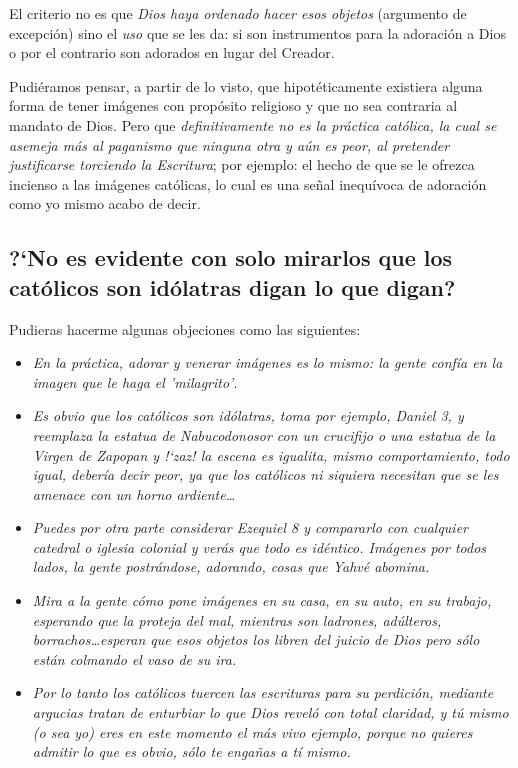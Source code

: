 \documentclass{article}
\begin{document}
\noindent
El criterio no es que \emph{Dios haya ordenado hacer esos objetos} (argumento de excepci\'on) sino el \emph{uso} que se les da: si son instrumentos para la adoraci\'on a Dios o por el contrario son adorados en lugar del Creador.

Pudi\'eramos pensar, a partir de lo visto, que hipot\'eticamente existiera alguna forma de tener im\'agenes con prop\'osito religioso y que no sea contraria al mandato de Dios. Pero que \emph{definitivamente no es la pr\'actica cat\'olica, la cual se asemeja m\'as al paganismo que ninguna otra y a\'un es peor, al pretender justificarse torciendo la Escritura}; por ejemplo: el hecho de que se le ofrezca incienso a las im\'agenes cat\'olicas, lo cual es una se\~nal inequ\'ivoca de adoraci\'on como yo mismo acabo de decir.
\subsection{?`No es evidente con solo mirarlos que los cat\'olicos son id\'olatras digan lo que digan?}

Pudieras hacerme algunas objeciones como las siguientes:

\begin{itemize}
\item
\emph{En la pr\'actica, adorar y venerar im\'agenes es lo mismo: la gente conf\'{i}a en la imagen que le haga el 'milagrito'}.

\item
\emph{Es obvio que los cat\'olicos son id\'olatras, toma por ejemplo, Daniel 3, y reemplaza la estatua de Nabucodonosor con un crucifijo o una estatua de la Virgen de Zapopan y !`zaz! la escena es igualita, mismo comportamiento, todo igual, deber\'{i}a decir peor, ya que los cat\'olicos ni siquiera necesitan que se les amenace con un horno ardiente\ldots}

\item
\emph{Puedes por otra parte considerar Ezequiel 8 y compararlo con cualquier catedral o iglesia colonial y ver\'as que todo es id\'entico. Im\'agenes por todos lados, la gente postr\'andose, adorando, cosas que Yahv\'e abomina.}

\item
\emph{Mira a la gente c\'omo pone im\'agenes en su casa, en su auto, en su trabajo, esperando que la proteja del mal, mientras son ladrones, ad\'ulteros, borrachos\ldots esperan que esos objetos los libren del juicio de Dios pero s\'olo est\'an colmando el vaso de su ira.}

\item
\emph{Por lo tanto los cat\'olicos tuercen las escrituras para su perdici\'on, mediante argucias tratan de enturbiar lo que Dios revel\'o con total claridad, y t\'u mismo \emph{(o sea yo)} eres en este momento el más vivo ejemplo, porque no quieres admitir lo que es obvio, s\'olo te enga\~nas a t\'{i} mismo.}
\end{itemize}
\end{document}
